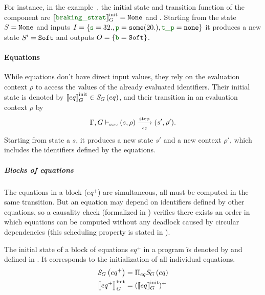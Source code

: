 For instance, in the \aeb example~, the initial state and transition function
of the component  are $\initsync{\idf{braking\_strat}} = \No$ and
.
Starting from the state $S = \mathtt{{None}}$ and inputs $I = \{\idf{s} = 32., \idf{p} = \some{20.},
    \idf{t\_p}=\none\}$
it produces a new state $S' = \mathtt{{Soft}}$ and outputs $O = \{\idf{b}=\Soft\}$.

\paragraph{Equations}

While equations don't have direct input values, they rely on the evaluation context $\rho$ to access
the values of the already evaluated identifiers.
%
Their initial state is denoted by  $\left\llbracket eq \right\rrbracket_G^\text{init} \in \textit{S}_{G}\left(eq\right)$, and their transition in an
evaluation context $\rho$ by
\begin{equation*}
    \eqOpsem{\rho}{s}{eq}{s'}{\rho'}.
\end{equation*}
Starting from state a $s$, it produces a new state $s'$ and a new context $\rho'$, which includes
the identifiers defined by the equations.

\subparagraph{Blocks of equations}

The equations in a block ($eq^+$) are simultaneous, all must be computed in the same transition.
But an equation may depend on identifiers defined by other equations, so a causality check
(formalized in ) verifies there exists an order in
which equations can be computed without any deadlock caused by circular dependencies
(this scheduling property is stated in ).

The initial state of a block of equations $eq^+$ in a program \G is denoted by 
and defined in . It corresponds to the initialization of
all individual equations.
\begin{align}
    \textit{S}_{G}\left(eq^+\right)  & = \Pi_{eq} \textit{S}_{G}\left(eq\right) \label{eq:semantics:grsync:opsem:stateTy:eqs} \\
    \left\llbracket eq^+ \right\rrbracket_G^\text{init} & = (\left\llbracket eq \right\rrbracket_G^\text{init})^+ \label{eq:semantics:grsync:opsem:init:eqs}
\end{align}

